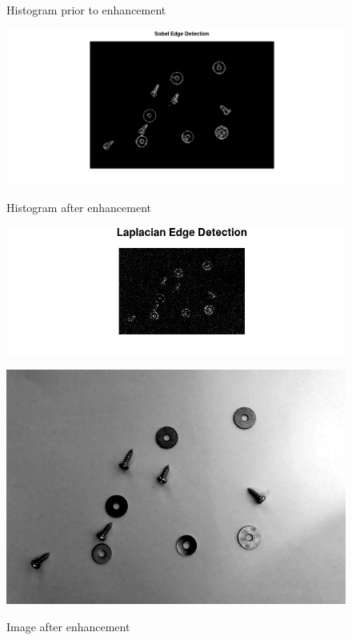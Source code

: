 \documentclass{article}
\begin{document}
\begin{figure}[hbt!]
\begin{minipage}{0.3\textwidth}
	\caption{Histogram prior to enhancement}
	\includegraphics[width=\textwidth]{scaled_histogram}
	\label{fig:scaled_histogram}
\end{minipage}
\begin{minipage}{0.3\textwidth}
	\caption{Histogram after enhancement}
	\includegraphics[width=\textwidth]{enhanced_histogram}
	\label{fig:enhanced_histogram}
\end{minipage}
\begin{minipage}{0.3\textwidth}
	\caption{Image after enhancement}
	\includegraphics[width=\textwidth]{enhanced}
	\label{fig:enhanced}
\end{minipage}
\end{figure}
\end{document}
